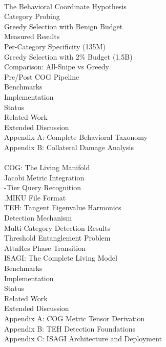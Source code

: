 \documentclass[11pt]{article}
\begin{document}
\vspace{6pt}
\\
\quad The Behavioral Coordinate Hypothesis\\
\quad Category Probing\\
\quad Greedy Selection with Benign Budget\\
\quad Measured Results\\
\quad \quad Per-Category Specificity (135M)\\
\quad \quad Greedy Selection with 2\% Budget (1.5B)\\
\quad \quad Comparison: All-Snipe vs Greedy\\
\quad Pre/Post COG Pipeline\\
\quad Benchmarks\\
\quad Implementation\\
\quad Status\\
\quad Related Work\\
\quad Extended Discussion\\
\quad Appendix A: Complete Behavioral Taxonomy\\
\quad Appendix B: Collateral Damage Analysis\\

\vspace{6pt}
\\
\quad COG: The Living Manifold\\
\quad \quad Jacobi Metric Integration\\
\quad {}-Tier Query Recognition\\
\quad \quad .MIKU File Format\\
\quad TEH: Tangent Eigenvalue Harmonics\\
\quad \quad Detection Mechanism\\
\quad \quad Multi-Category Detection Results\\
\quad \quad Threshold Entanglement Problem\\
\quad AttnRes Phase Transition\\
\quad ISAGI: The Complete Living Model\\
\quad Benchmarks\\
\quad Implementation\\
\quad Status\\
\quad Related Work\\
\quad Extended Discussion\\
\quad Appendix A: COG Metric Tensor Derivation\\
\quad Appendix B: TEH Detection Foundations\\
\quad Appendix C: ISAGI Architecture and Deployment\\
\end{document}
